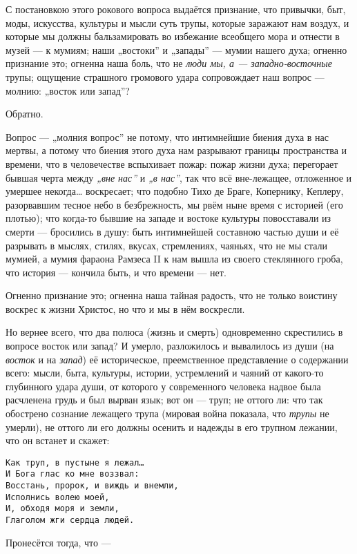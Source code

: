 \documentclass[12pt,a4paper,oneside]{book}
\begin{document}
С постановкою этого рокового вопроса выдаётся признание, что привычки, быт, моды, искусства, культуры и мысли суть трупы, которые заражают нам воздух, и которые мы должны бальзамировать во избежание всеобщего мора и отнести в музей — к мумиям; наши „востоки” и „запады” — мумии нашего духа; огненно признание это; огненна наша боль, что не \emph{люди мы, а — западно-восточные} трупы; ощущение страшного громового удара сопровождает наш вопрос — молнию: „восток или запад”?

Обратно.

Вопрос — „молния вопрос” не потому, что интимнейшие биения духа в нас мертвы, а потому что биения этого духа нам разрывают границы пространства и времени, что в человечестве вспыхивает пожар: пожар жизни духа; перегорает бывшая черта между \emph{„вне нас”} и \emph{„в нас”}, так что всё вне-лежащее, отложенное и умершее некогда… воскресает; что подобно Тихо де Браге, Копернику, Кеплеру, разорвавшим тесное небо в безбрежность, мы рвём ныне время с историей (его плотью); что когда-то бывшие на западе и востоке культуры повосставали из смерти — бросились в душу: быть интимнейшей составною частью души и её разрывать в мыслях, стилях, вкусах, стремлениях, чаяньях, что не мы стали мумией, а мумия фараона Рамзеса II к нам вышла из своего стеклянного гроба, что история — кончила быть, и что времени — нет.

Огненно признание это; огненна наша тайная радость, что не только воистину воскрес к жизни Христос, но что и мы в нём воскресли.

Но вернее всего, что два полюса (жизнь и смерть) одновременно скрестились в вопросе восток или запад? И умерло, разложилось и вывалилось из души (на \emph{восток} и на \emph{запад}) её историческое, преемственное представление о содержании всего: мысли, быта, культуры, истории, устремлений и чаяний от какого-то глубинного удара души, от которого у современного человека надвое была расчленена грудь и был вырван язык; вот он — труп; не оттого ли: что так обострено сознание лежащего трупа (мировая война показала, что \emph{трупы} не умерли), не оттого ли его должны осенить и надежды в его трупном лежании, что он встанет и скажет:

\begin{Verbatim}
Как труп, в пустыне я лежал…
И Бога глас ко мне воззвал:
Восстань, пророк, и виждь и внемли,
Исполнись волею моей,
И, обходя моря и земли,
Глаголом жги сердца людей.
\end{Verbatim}

Пронесётся тогда, что —
\end{document}

